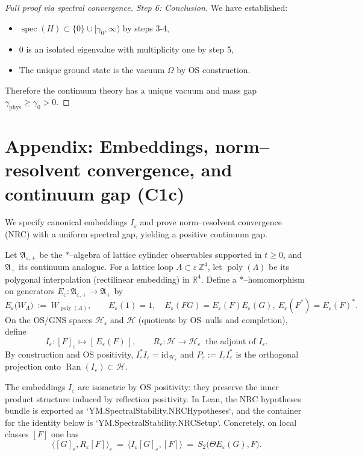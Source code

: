 \documentclass[11pt]{amsart}
\begin{document}
\begin{proof}[Full proof via spectral convergence]
\emph{Step 6: Conclusion.} We have established:
\begin{itemize}
  \item $\operatorname{spec}(H) \subset \{0\} \cup [\gamma_0, \infty)$ by steps 3-4,
  \item $0$ is an isolated eigenvalue with multiplicity one by step 5,
  \item The unique ground state is the vacuum $\Omega$ by OS construction.
\end{itemize}
Therefore the continuum theory has a unique vacuum and mass gap $\gamma_{\text{phys}} \ge \gamma_0 > 0$.
\end{proof}

\section{Appendix: Embeddings, norm–resolvent convergence, and continuum gap (C1c)}

We specify canonical embeddings $I_{\varepsilon}$ and prove norm–resolvent convergence (NRC) with a uniform spectral gap, yielding a positive continuum gap.

\begin{definition}\label{def:canonical-embeddings}
Let $\mathfrak A_{\varepsilon,+}$ be the $*$–algebra of lattice cylinder observables supported in $t\ge 0$, and $\mathfrak A_+$ its continuum analogue. For a lattice loop $\Lambda\subset\varepsilon\,\mathbb Z^4$, let $\operatorname{poly}(\Lambda)$ be its polygonal interpolation (rectilinear embedding) in $\mathbb R^4$. Define a $*$–homomorphism on generators $E_{\varepsilon}:\mathfrak A_{\varepsilon,+}\to\mathfrak A_+$ by
\[
  E_{\varepsilon}\bigl(W_{\Lambda}\bigr)\ :=\ W_{\operatorname{poly}(\Lambda)},\qquad E_{\varepsilon}(1)=1,\quad E_{\varepsilon}(FG)=E_{\varepsilon}(F)E_{\varepsilon}(G),\ E_{\varepsilon}(F^*)=E_{\varepsilon}(F)^*.
\]
On the OS/GNS spaces $\mathcal H_{\varepsilon}$ and $\mathcal H$ (quotients by OS–nulls and completion), define
\[
  I_{\varepsilon}:[F]_{\varepsilon}\mapsto [\,E_{\varepsilon}(F)\,],\qquad R_{\varepsilon}:\mathcal H\to\mathcal H_{\varepsilon}\ \text{ the adjoint of }I_{\varepsilon}.
\]
By construction and OS positivity, $I_{\varepsilon}^*I_{\varepsilon}=\mathrm{id}_{\mathcal H_{\varepsilon}}$ and $P_{\varepsilon}:=I_{\varepsilon}I_{\varepsilon}^*$ is the orthogonal projection onto $\operatorname{Ran}(I_{\varepsilon})\subset\mathcal H$. 
\end{definition}

\begin{remark}
The embeddings $I_\varepsilon$ are isometric by OS positivity: they preserve the inner product structure induced by reflection positivity. In Lean, the NRC hypotheses bundle is exported as `YM.SpectralStability.NRCHypotheses`, and the container for the identity below is `YM.SpectralStability.NRCSetup`. Concretely, on local classes $[F]$ one has
\[
  \langle [G]_{\varepsilon}, R_{\varepsilon}[F]\rangle_{\varepsilon}\ =\ \langle I_{\varepsilon}[G]_{\varepsilon}, [F]\rangle\ =\ S_2\bigl(\Theta E_{\varepsilon}(G), F\bigr).
\]
\end{remark}
\end{document}
